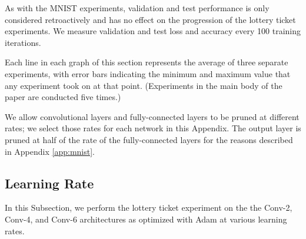 As with the MNIST experiments, validation and test performance is only considered retroactively and has no effect on the progression of the
lottery ticket experiments. We measure validation and test loss and accuracy every 100 training iterations.

Each line in each graph of this section represents the average of three separate experiments, with error bars indicating the minimum and maximum
value that any experiment took on at that point. (Experiments in the main body of the paper are conducted five times.)

We allow convolutional layers and fully-connected layers to be pruned at different rates; we select those rates for each network in this Appendix. The output
layer is pruned at half of the rate of the fully-connected layers for the reasons described in Appendix \ref{app:mnist}.

\subsection{Learning Rate}
\label{app:conv-learning-rate}

In this Subsection, we perform the lottery ticket experiment on the the Conv-2, Conv-4, and Conv-6 architectures as optimized with
Adam at various learning rates.




